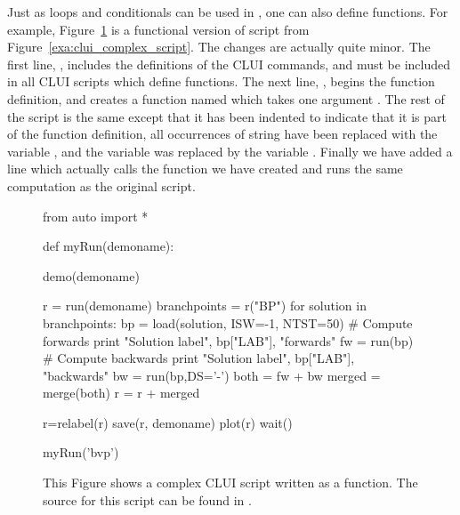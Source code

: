 \documentclass[12pt]{report}
\begin{document}
 Just as loops and conditionals can be used in \python,
 one can also define functions.  For example,
 Figure~\ref{exa:clui_complex_function} is a
 functional version of script from 
 Figure~\ref{exa:clui_complex_script}.
 The changes are actually quite minor.  
 The first line, ,
 includes the definitions of the \AUTO CLUI commands,
 and must be included in all \AUTO CLUI scripts
 which define functions.
 The next line, 
 ,
 begins the function definition, and 
 creates a function named  which
 takes one argument .  The
 rest of the script is the same except that it
 has been indented to indicate that it is
 part of the function definition, all occurrences
 of string  have been replaced
 with the variable , and the variable
  was replaced by the variable .
 Finally we have added a line 
 which actually calls the function we have 
 created and runs the same computation as
 the original script.

 \begin{figure}[htbp]
 {\small \begin{center} \begin{boxedverbatim}
 from auto import *

 def myRun(demoname):

     demo(demoname)

     r = run(demoname)
     branchpoints = r("BP")
     for solution in branchpoints:
         bp = load(solution, ISW=-1, NTST=50)
         # Compute forwards
         print "Solution label", bp["LAB"], "forwards"
         fw = run(bp)
         # Compute backwards
         print "Solution label", bp["LAB"], "backwards"
         bw = run(bp,DS='-')
         both = fw + bw
         merged = merge(both)
         r = r + merged

     r=relabel(r)
     save(r, demoname)
     plot(r)
     wait()

 myRun('bvp')

 \end{boxedverbatim}
 \end{center} 
 }
 \caption[A complex \AUTO CLUI script as a function.]
 {This Figure shows a complex \AUTO CLUI script
 written as a function.
 The source for this script can be found in .
 }
 \label{exa:clui_complex_function}
 \end{figure}
\end{document}
